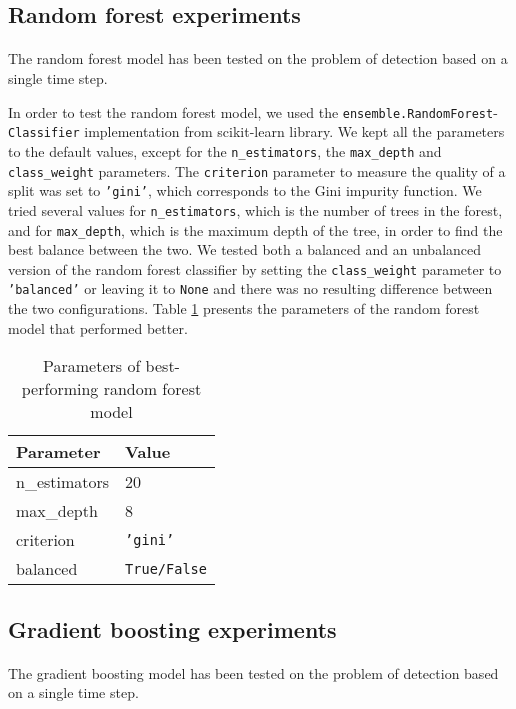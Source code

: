 \subsection{Random forest experiments}
\paragraph{} The random forest model has been tested on the problem of detection based on a single time step.

In order to test the random forest model, we used the \texttt{ensemble.RandomForest}-\texttt{Classifier} implementation from scikit-learn library. We kept all the parameters to the default values, except for the \texttt{n\_estimators}, the \texttt{max\_depth} and \texttt{class\_weight} parameters. The \texttt{criterion} parameter to measure the quality of a split was set to \texttt{'gini'}, which corresponds to the Gini impurity function. We tried several values for \texttt{n\_estimators}, which is the number of trees in the forest, and for \texttt{max\_depth}, which is the maximum depth of the tree, in order to find the best balance between the two. We tested both a balanced and an unbalanced version of the random forest classifier by setting the \texttt{class\_weight} parameter to \texttt{'balanced'} or leaving it to \texttt{None} and there was no resulting difference between the two configurations. Table \ref{tab:randomforest_param} presents the parameters of the random forest model that performed better.
\begin{table}[htbp]
    \centering
    \begin{tabular}{ll}
        \hline
        \textbf{Parameter}  & \textbf{Value} \\\hline
        n\_estimators       & 20 \\
        max\_depth          & 8 \\
        criterion           & \texttt{'gini'} \\
        balanced            & \texttt{True/False}
    \end{tabular}
    \caption{Parameters of best-performing random forest model}
    \label{tab:randomforest_param}
\end{table}

\subsection{Gradient boosting experiments}
\paragraph{} The gradient boosting model has been tested on the problem of detection based on a single time step.

